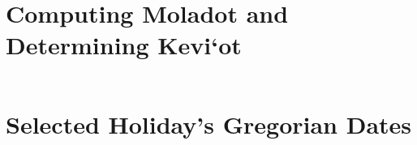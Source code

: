 \chapter{Computing Moladot and Determining Kevi`ot}

\begin{footnotesize}
	\begin{tabular}{c | c | c | c | c | c | c | c | c | c | c | c}
		
	\end{tabular}
\end{footnotesize}

\chapter{Selected Holiday's Gregorian Dates}
